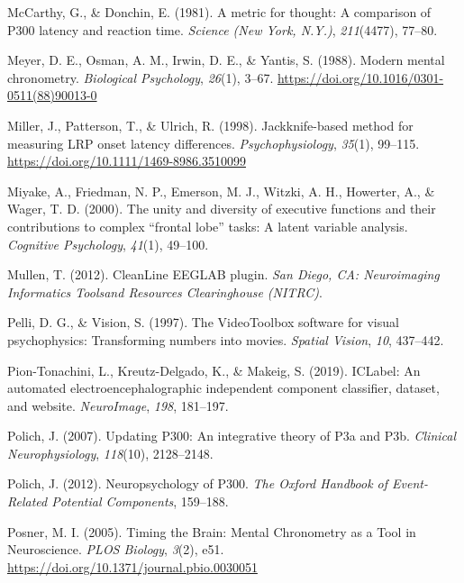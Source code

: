 \documentclass[
  man]{apa7}
\newlength{\cslhangindent}
\newlength{\cslentryspacingunit} %
\newenvironment{CSLReferences}[2] %
 {%
  \setlength{\parindent}{0pt}
  \ifodd #1
  \let\oldpar\par
  \def\par{\hangindent=\cslhangindent\oldpar}
  \fi
  \setlength{\parskip}{#2\cslentryspacingunit}
 }%
 {}
\begin{document}
\begin{CSLReferences}{1}{0}
\leavevmode{}%
McCarthy, G., \& Donchin, E. (1981). A metric for thought: A comparison of {P300} latency and reaction time. \emph{Science (New York, N.Y.)}, \emph{211}(4477), 77--80.

\leavevmode{}%
Meyer, D. E., Osman, A. M., Irwin, D. E., \& Yantis, S. (1988). Modern mental chronometry. \emph{Biological Psychology}, \emph{26}(1), 3--67. \url{https://doi.org/10.1016/0301-0511(88)90013-0}

\leavevmode{}%
Miller, J., Patterson, T., \& Ulrich, R. (1998). Jackknife-based method for measuring {LRP} onset latency differences. \emph{Psychophysiology}, \emph{35}(1), 99--115. \url{https://doi.org/10.1111/1469-8986.3510099}

\leavevmode{}%
Miyake, A., Friedman, N. P., Emerson, M. J., Witzki, A. H., Howerter, A., \& Wager, T. D. (2000). The unity and diversity of executive functions and their contributions to complex {``frontal lobe''} tasks: {A} latent variable analysis. \emph{Cognitive Psychology}, \emph{41}(1), 49--100.

\leavevmode{}%
Mullen, T. (2012). {CleanLine} {EEGLAB} plugin. \emph{San Diego, CA: Neuroimaging Informatics Toolsand Resources Clearinghouse (NITRC)}.

\leavevmode{}%
Pelli, D. G., \& Vision, S. (1997). The {VideoToolbox} software for visual psychophysics: {Transforming} numbers into movies. \emph{Spatial Vision}, \emph{10}, 437--442.

\leavevmode{}%
Pion-Tonachini, L., Kreutz-Delgado, K., \& Makeig, S. (2019). {ICLabel}: {An} automated electroencephalographic independent component classifier, dataset, and website. \emph{NeuroImage}, \emph{198}, 181--197.

\leavevmode{}%
Polich, J. (2007). Updating {P300}: An integrative theory of {P3a} and {P3b}. \emph{Clinical Neurophysiology}, \emph{118}(10), 2128--2148.

\leavevmode{}%
Polich, J. (2012). Neuropsychology of {P300}. \emph{The Oxford Handbook of Event-Related Potential Components}, 159--188.

\leavevmode{}%
Posner, M. I. (2005). Timing the {Brain}: {Mental} {Chronometry} as a {Tool} in {Neuroscience}. \emph{PLOS Biology}, \emph{3}(2), e51. \url{https://doi.org/10.1371/journal.pbio.0030051}


\end{CSLReferences}
\end{document}

